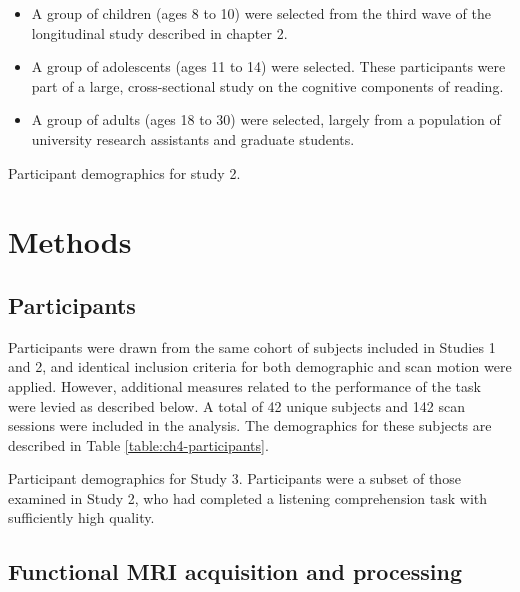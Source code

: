 \begin{itemize}
	\item A group of children (ages 8 to 10) were selected from the third wave of the longitudinal study described in chapter 2. 
	\item A group of adolescents (ages 11 to 14) were selected. These participants were part of a large, cross-sectional study on the cognitive components of reading.
	\item A group of adults (ages 18 to 30) were selected, largely from a population of university research assistants and graduate students.
\end{itemize}

\begin{table}[t]
	\renewcommand{\tabcolsep}{0.09cm}
	\centering
	
	\caption{Participant demographics for study 2.}
	\label{table:ch5-participants}
\end{table}

\section{Methods}

\subsection{Participants}

Participants were drawn from the same cohort of subjects included in Studies 1 and 2, and identical inclusion criteria for both demographic and scan motion were applied. However, additional measures related to the performance of the task were levied as described below. A total of 42 unique subjects and 142 scan sessions were included in the analysis. The demographics for these subjects are described in Table \ref{table:ch4-participants}.

\begin{table}[t]
	\renewcommand{\tabcolsep}{0.09cm}
	\centering
	
	\caption[Participant demographics for Study 3.]{Participant demographics for Study 3. Participants were a subset of those examined in Study 2, who had completed a listening comprehension task with sufficiently high quality.}
	\label{table:ch4-participants}
\end{table}

\subsection{Functional MRI acquisition and processing}

